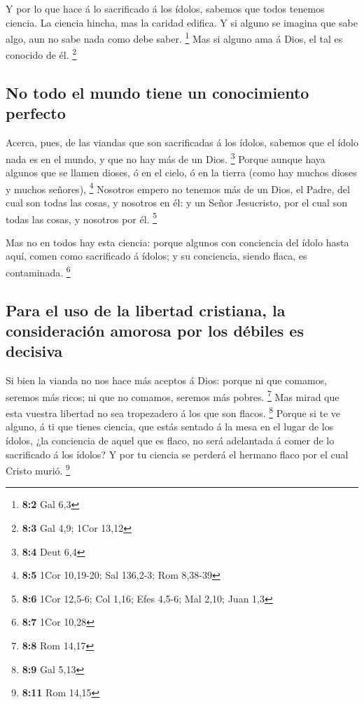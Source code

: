  Y por lo que hace á lo sacrificado á los ídolos, sabemos
que todos tenemos ciencia. La ciencia hincha, mas la caridad edifica.
 Y si alguno se imagina que sabe algo, aun no sabe nada como
debe saber. \footnote{\textbf{8:2} Gal 6,3}  Mas si alguno
ama á Dios, el tal es conocido de él. \footnote{\textbf{8:3} Gal 4,9;
  1Cor 13,12}

\hypertarget{no-todo-el-mundo-tiene-un-conocimiento-perfecto}{%
\subsection{No todo el mundo tiene un conocimiento
perfecto}\label{no-todo-el-mundo-tiene-un-conocimiento-perfecto}}

 Acerca, pues, de las viandas que son sacrificadas á los
ídolos, sabemos que el ídolo nada es en el mundo, y que no hay más de un
Dios. \footnote{\textbf{8:4} Deut 6,4}  Porque aunque haya
algunos que se llamen dioses, ó en el cielo, ó en la tierra (como hay
muchos dioses y muchos señores), \footnote{\textbf{8:5} 1Cor 10,19-20;
  Sal 136,2-3; Rom 8,38-39}  Nosotros empero no tenemos más
de un Dios, el Padre, del cual son todas las cosas, y nosotros en él: y
un Señor Jesucristo, por el cual son todas las cosas, y nosotros por él.
\footnote{\textbf{8:6} 1Cor 12,5-6; Col 1,16; Efes 4,5-6; Mal 2,10; Juan
  1,3}

 Mas no en todos hay esta ciencia: porque algunos con
conciencia del ídolo hasta aquí, comen como sacrificado á ídolos; y su
conciencia, siendo flaca, es contaminada. \footnote{\textbf{8:7} 1Cor
  10,28}

\hypertarget{para-el-uso-de-la-libertad-cristiana-la-consideraciuxf3n-amorosa-por-los-duxe9biles-es-decisiva}{%
\subsection{Para el uso de la libertad cristiana, la consideración
amorosa por los débiles es
decisiva}\label{para-el-uso-de-la-libertad-cristiana-la-consideraciuxf3n-amorosa-por-los-duxe9biles-es-decisiva}}

 Si bien la vianda no nos hace más aceptos á Dios: porque ni
que comamos, seremos más ricos; ni que no comamos, seremos más pobres.
\footnote{\textbf{8:8} Rom 14,17}  Mas mirad que esta
vuestra libertad no sea tropezadero á los que son flacos. \footnote{\textbf{8:9}
  Gal 5,13}  Porque si te ve alguno, á ti que tienes
ciencia, que estás sentado á la mesa en el lugar de los ídolos, ¿la
conciencia de aquel que es flaco, no será adelantada á comer de lo
sacrificado á los ídolos?  Y por tu ciencia se perderá el
hermano flaco por el cual Cristo murió. \footnote{\textbf{8:11} Rom
  14,15}

